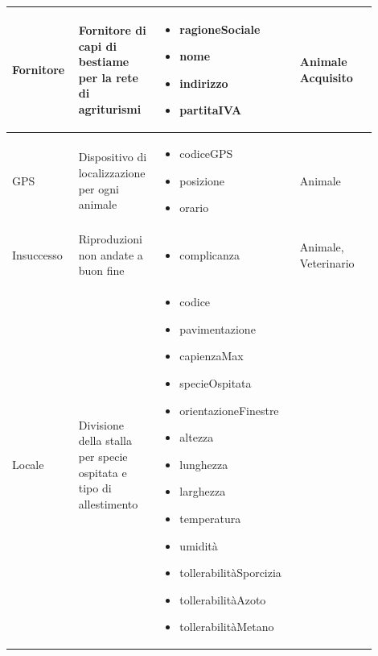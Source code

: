 \documentclass[12pt,a4paper]{article}
\begin{document}
\begin{center}
\begin{longtable}{|p{0.14\linewidth}|p{0.20\linewidth}|p{0.36\linewidth}|p{0.20\linewidth}|}
\hline
Fornitore 			&  Fornitore di capi di bestiame per la rete di agriturismi  
					& \begin{itemize}
						\setlength{\itemindent}{-1em}
						\vspace{-25pt}
						\setlength\itemsep{-0.25em}
						\item ragioneSociale
						\item nome
						\item indirizzo
						\item partitaIVA
					\end{itemize}
					&  Animale Acquisito  \\ 

\hline
GPS 					&  Dispositivo di localizzazione per ogni animale 
					& \begin{itemize}
						\setlength{\itemindent}{-1em}
						\vspace{-25pt}
						\setlength\itemsep{-0.25em}
						\item codiceGPS
						\item posizione
						\item orario
						
					\end{itemize}
					&  Animale \\

\hline
Insuccesso				&  Riproduzioni non andate a buon fine 
					& \begin{itemize}
						\setlength{\itemindent}{-1em}
						\vspace{-25pt}
						\setlength\itemsep{-0.25em}
						\item complicanza
					\end{itemize}
					&  Animale, Veterinario \\

\hline
Locale 				&  Divisione della stalla per specie ospitata e tipo di allestimento  
					& \begin{itemize}
						\setlength{\itemindent}{-1em}
						\vspace{-25pt}
						\setlength\itemsep{-0.25em}
						\item codice
						\item pavimentazione
						\item capienzaMax
						\item specieOspitata
						\item orientazioneFinestre
						\item altezza
						\item lunghezza
						\item larghezza
						\item temperatura
						\item umidità
						\item tollerabilitàSporcizia
						\item tollerabilitàAzoto
						\item tollerabilitàMetano
						

\end{itemize}
\end{longtable}
\end{center}
\end{document}
